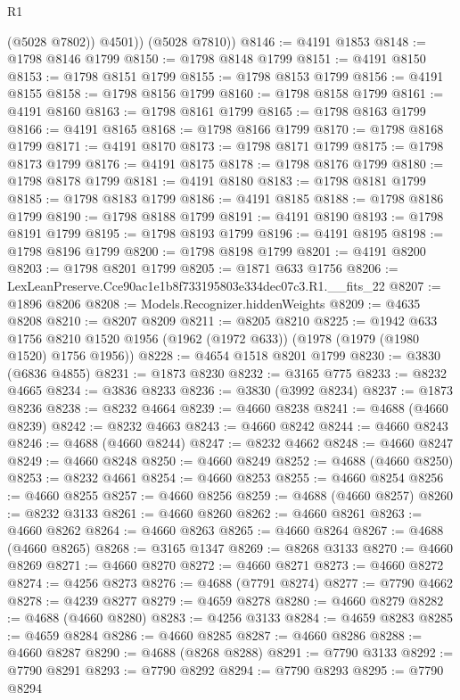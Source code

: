 \begin{lexlean}{R1}
\begin{coremodule}
            (@5028 @7802))
          @4501))
      (@5028 @7810))
@8146 := @4191 @1853
@8148 := @1798 @8146 @1799
@8150 := @1798 @8148 @1799
@8151 := @4191 @8150
@8153 := @1798 @8151 @1799
@8155 := @1798 @8153 @1799
@8156 := @4191 @8155
@8158 := @1798 @8156 @1799
@8160 := @1798 @8158 @1799
@8161 := @4191 @8160
@8163 := @1798 @8161 @1799
@8165 := @1798 @8163 @1799
@8166 := @4191 @8165
@8168 := @1798 @8166 @1799
@8170 := @1798 @8168 @1799
@8171 := @4191 @8170
@8173 := @1798 @8171 @1799
@8175 := @1798 @8173 @1799
@8176 := @4191 @8175
@8178 := @1798 @8176 @1799
@8180 := @1798 @8178 @1799
@8181 := @4191 @8180
@8183 := @1798 @8181 @1799
@8185 := @1798 @8183 @1799
@8186 := @4191 @8185
@8188 := @1798 @8186 @1799
@8190 := @1798 @8188 @1799
@8191 := @4191 @8190
@8193 := @1798 @8191 @1799
@8195 := @1798 @8193 @1799
@8196 := @4191 @8195
@8198 := @1798 @8196 @1799
@8200 := @1798 @8198 @1799
@8201 := @4191 @8200
@8203 := @1798 @8201 @1799
@8205 := @1871 @633 @1756
@8206 := LexLeanPreserve.Cce90ac1e1b8f733195803e334dec07c3.R1.__fits_22
@8207 := @1896 @8206
@8208 := Models.Recognizer.hiddenWeights
@8209 := @4635 @8208
@8210 := @8207 @8209
@8211 := @8205 @8210
@8225 := @1942
    @633
    @1756
    @8210
    @1520
    @1956
    (@1962 (@1972 @633))
    (@1978 (@1979 (@1980 @1520) @1756 @1956))
@8228 := @4654 @1518 @8201 @1799
@8230 := @3830 (@6836 @4855)
@8231 := @1873 @8230
@8232 := @3165 @775
@8233 := @8232 @4665
@8234 := @3836 @8233
@8236 := @3830 (@3992 @8234)
@8237 := @1873 @8236
@8238 := @8232 @4664
@8239 := @4660 @8238
@8241 := @4688 (@4660 @8239)
@8242 := @8232 @4663
@8243 := @4660 @8242
@8244 := @4660 @8243
@8246 := @4688 (@4660 @8244)
@8247 := @8232 @4662
@8248 := @4660 @8247
@8249 := @4660 @8248
@8250 := @4660 @8249
@8252 := @4688 (@4660 @8250)
@8253 := @8232 @4661
@8254 := @4660 @8253
@8255 := @4660 @8254
@8256 := @4660 @8255
@8257 := @4660 @8256
@8259 := @4688 (@4660 @8257)
@8260 := @8232 @3133
@8261 := @4660 @8260
@8262 := @4660 @8261
@8263 := @4660 @8262
@8264 := @4660 @8263
@8265 := @4660 @8264
@8267 := @4688 (@4660 @8265)
@8268 := @3165 @1347
@8269 := @8268 @3133
@8270 := @4660 @8269
@8271 := @4660 @8270
@8272 := @4660 @8271
@8273 := @4660 @8272
@8274 := @4256 @8273
@8276 := @4688 (@7791 @8274)
@8277 := @7790 @4662
@8278 := @4239 @8277
@8279 := @4659 @8278
@8280 := @4660 @8279
@8282 := @4688 (@4660 @8280)
@8283 := @4256 @3133
@8284 := @4659 @8283
@8285 := @4659 @8284
@8286 := @4660 @8285
@8287 := @4660 @8286
@8288 := @4660 @8287
@8290 := @4688 (@8268 @8288)
@8291 := @7790 @3133
@8292 := @7790 @8291
@8293 := @7790 @8292
@8294 := @7790 @8293
@8295 := @7790 @8294

\end{coremodule}
\end{lexlean}
